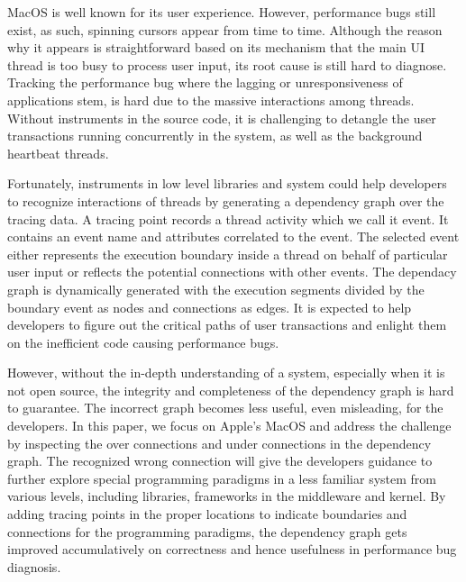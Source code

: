 MacOS is well known for its user experience.
However, performance bugs still exist, as such, spinning cursors appear from time to time.
Although the reason why it appears is straightforward based on its mechanism that the main UI thread is too busy to process user input, its root cause is still hard to diagnose.
Tracking the performance bug where the lagging or unresponsiveness of applications stem, is hard due to the massive interactions among threads.
Without instruments in the source code, it is challenging to detangle the user transactions running concurrently in the system, as well as the background heartbeat threads.
\par
Fortunately, instruments in low level libraries and system could help developers to recognize interactions of threads by generating a dependency graph over the tracing data.
A tracing point records a thread activity which we call it event.
It contains an event name and attributes correlated to the event. 
The selected event either represents the execution boundary inside a thread on behalf of particular user input or reflects the potential connections with other events. 
The dependacy graph is dynamically generated with the execution segments divided by the boundary event as nodes and connections as edges.
It is expected to help developers to figure out the critical paths of user transactions and enlight them on the inefficient code causing performance bugs.
\par
However, without the in-depth understanding of a system, especially when it is not open source, the integrity and completeness of the dependency graph is hard to guarantee.
The incorrect graph becomes less useful, even misleading, for the developers.
In this paper, we focus on Apple's MacOS and address the challenge by inspecting the over connections and under connections in the dependency graph.
The recognized wrong connection will give the developers guidance to further explore special programming paradigms in a less familiar system from various levels, including libraries, frameworks in the middleware and kernel.
By adding tracing points in the proper locations to indicate boundaries and connections for the programming paradigms, the dependency graph gets improved accumulatively on correctness and hence usefulness in performance bug diagnosis.
